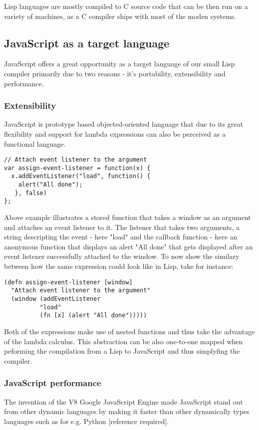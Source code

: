 Lisp languages are mostly compiled to C source code that can be then run on a variety of machines, as a C compiler ships with most of the moden systems.

\subsection{JavaScript as a target language}
JavaScript offers a great opportunity as a target language of our small Lisp compiler primarily due to two reasons - it's portability, extensibility and performance.

\subsubsection{Extensibility}
JavaScript is prototype based objected-oriented language that due to its great flexibility and support for lambda expressions can also be perceived as a functional language.

\begin{lstlisting}
// Attach event listener to the argument
var assign-event-listener = function(x) {
  x.addEventListener("load", function() { 
  	alert("All done"); 
   }, false)
};
\end{lstlisting}

Above example illustrates a stored function that takes a window as an argument and attaches an event listener to it. The listener that takes two arguments, a string descripting the event - here "load" and the callback function - here an anonymous function that displays an alert "All done" that gets displayed after an event listener successfully attached to the window.
To now show the similary between how the same expression could look like in Lisp, take for instance:

\begin{lstlisting}
(defn assign-event-listener [window]
  "Attach event listener to the argument"
  (window (addEventListener 
  	   	  "load" 
		  (fn [x] (alert "All done")))))
\end{lstlisting}

Both of the expressions make use of nested functions and thus take the advantage of the lambda calculus. This abstraction can be also one-to-one mapped when peforming the compilation from a Lisp to JavaScript and thus simplyfing the compiler.

\subsubsection{JavaScript performance}
The invention of the V8 Google JavaScript Engine made JavaScript stand out from other dynamic languages by making it faster than other dynamically types languages such as for e.g. Python [reference required].


